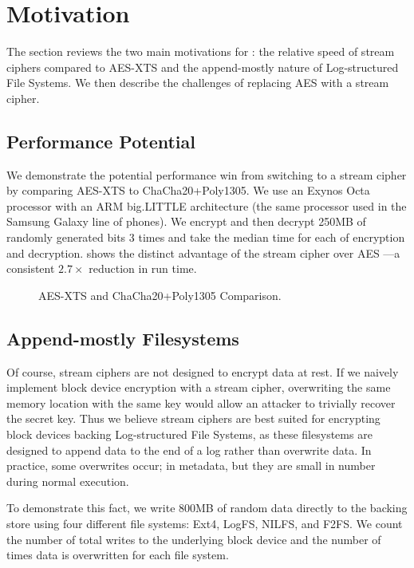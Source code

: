 \chapter{Motivation} \label{sec:motivation}

The section reviews the two main motivations for \SYSTEM{}: the
relative speed of stream ciphers compared to AES-XTS and the
append-mostly nature of Log-structured File Systems. We then describe
the challenges of replacing AES with a stream cipher.

\section{Performance Potential}

We demonstrate the potential performance win from switching to a stream cipher
by comparing AES-XTS to ChaCha20+Poly1305.  We use an Exynos Octa processor with
an ARM big.LITTLE architecture (the same processor used in the Samsung Galaxy
line of phones).  We encrypt and then decrypt 250MB of randomly generated bits 3
times and take the median time for each of encryption and decryption.
 shows the distinct advantage of the stream cipher over AES
---a consistent $2.7\times$ reduction in run time.

\begin{figure}[t]
  \centering
  
\caption{AES-XTS and ChaCha20+Poly1305 Comparison.}
\label{fig:motivation}
\end{figure}

\section{Append-mostly Filesystems}
Of course, stream ciphers are not designed to encrypt data at rest.
If we naively implement block device encryption with a stream cipher,
overwriting the same memory location with the same key would allow an
attacker to trivially recover the secret key.  Thus we believe stream
ciphers are best suited for encrypting block devices backing
Log-structured File Systems, as these filesystems are designed to
append data to the end of a log rather than overwrite data.  In
practice, some overwrites occur; \eg{} in metadata, but they are small
in number during normal execution.

To demonstrate this fact, we write 800MB of random data directly to the
backing store using four different file systems: Ext4, LogFS, NILFS,
and F2FS.  We count the number of total writes to the underlying block
device and the number of times data is overwritten for each file
system.



